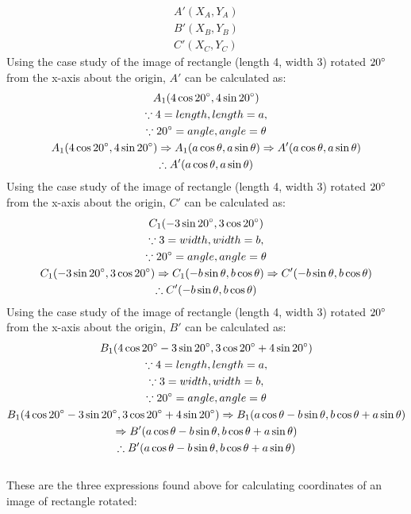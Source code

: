\documentclass{article}
\begin{document}
        \begin{align*}
            A'(X_A, Y_A) \\
            B'(X_B, Y_B) \\
            C'(X_C, Y_C)
        \end{align*}
        Using the case study of the image of rectangle (length 4, width 3) rotated $20\degree$ from the x-axis about the origin, $A'$ can be calculated as:
        \begin{gather*}
            A_1(4\cos{20\degree}, 4\sin{20\degree}) \\
            \because 4 = length, length = a, \\
            \because 20\degree = angle, angle = \theta \\
            A_1(4\cos{20\degree}, 4\sin{20\degree}) \Rightarrow A_1(a\cos{\theta}, a\sin{\theta}) \Rightarrow A'(a\cos{\theta}, a\sin{\theta}) \\
            \therefore A'(a\cos{\theta}, a\sin{\theta})
        \end{gather*}
        Using the case study of the image of rectangle (length 4, width 3) rotated $20\degree$ from the x-axis about the origin, $C'$ can be calculated as:
        \begin{gather*}
            C_1(-3\sin{20\degree}, 3\cos{20\degree}) \\
            \because 3 = width, width = b, \\
            \because 20\degree = angle, angle = \theta \\
            C_1(-3\sin{20\degree}, 3\cos{20\degree}) \Rightarrow C_1(-b\sin{\theta}, b\cos{\theta}) \Rightarrow C'(-b\sin{\theta}, b\cos{\theta}) \\
            \therefore C'(-b\sin{\theta}, b\cos{\theta})
        \end{gather*}
        Using the case study of the image of rectangle (length 4, width 3) rotated $20\degree$ from the x-axis about the origin, $B'$ can be calculated as:
        \begin{gather*}
            B_1(4\cos{20\degree} -3\sin{20\degree}, 3\cos{20\degree} + 4\sin{20\degree}) \\
            \because 4 = length, length = a, \\
            \because 3 = width, width = b, \\
            \because 20\degree = angle, angle = \theta \\
            B_1(4\cos{20\degree} -3\sin{20\degree}, 3\cos{20\degree} + 4\sin{20\degree}) \Rightarrow B_1(a\cos{\theta} -b\sin{\theta}, b\cos{\theta} + a\sin{\theta}) \\ \Rightarrow B'(a\cos{\theta} -b\sin{\theta}, b\cos{\theta} + a\sin{\theta}) \\
            \therefore B'(a\cos{\theta} -b\sin{\theta}, b\cos{\theta} + a\sin{\theta})
        \end{gather*} \\
        These are the three expressions found above for calculating coordinates of an image of rectangle rotated:
\end{document}
